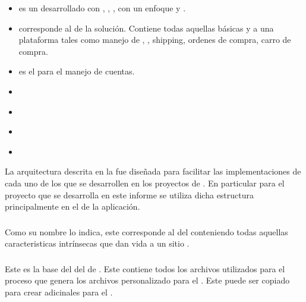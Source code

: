 	\begin{itemize}
		\item
			\textbf{\eframeworkAF} es un \frameworkPC \ecommerceCOM desarrollado con \meteorNAME, \nodejsNAME, \mongodbNAME, con un enfoque \reactive y \realTimeINT.
		\item
			\textbf{\eframeworkCorePCKG} corresponde al \coreAS de la solución. Contiene todas aquellas \featuresCPT básicas y \templatesAS a una plataforma \ecommerceCOM tales como manejo de \itemsCOM, \sessionsINT, shipping, ordenes de compra, carro de compra.
		\item
			\textbf{\eframeworkAccountsPCKG} es el \moduleAS para el manejo de cuentas.
		\item
			\textbf{\eframeworkCoreThemePCKG}
		\item
			\textbf{\eframeworkBootstrapThemePCKG}
		\item
			\textbf{\eframeworkShippingPCKG}
		\item
			\textbf{\eframeworkPaypalPCKG}
		
	\end{itemize}


La arquitectura descrita en la  fue diseñada para facilitar las implementaciones de cada uno de los \packagesAS que se desarrollen en los proyectos de \meteorNAME. En particular para el proyecto que se desarrolla en este informe se utiliza dicha estructura principalmente en el \packagesAS \coreAS de la aplicación.

\subsubsection{\eframeworkCorePCKG}

Como su nombre lo indica, este \packagesAS corresponde al \coreAS del \frameworkPC conteniendo todas aquellas caracteristicas intrínsecas que dan vida a un sitio \ecommerceCOM. 

\subsubsection{\eframeworkCoreThemePCKG}\label{chapter:section:subsection:package_core_theme}

Este \packagesAS es la base del \bootstrap \themeCPT del \frameworkPC de \ecommerceCOM. Este contiene todos los archivos \lessNAME utilizados para el proceso que genera los archivos \lessNAME personalizado para el \frameworkPC. Este \packagesAS puede ser copiado para crear \themeCPT adicinales para el \frameworkPC \ecommerceCOM.

